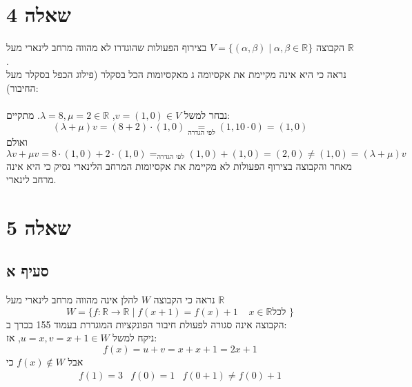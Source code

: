 \documentclass{article}
\newcommand\underrel[2]{\mathrel{\mathop{#2}\limits_{#1}}}
\DeclareMathOperator*{\equals}{=}
\begin{document}
\pagebreak

\section*{שאלה 4}

הקבוצה $V=\{(\alpha, \beta)\;|\; \alpha, \beta \in \mathbb{R}\}$
בצירוף הפעולות שהוגדרו לא מהווה מרחב לינארי מעל $\mathbb{R}$.\\
נראה כי היא אינה מקיימת את אקסיומה ג מאקסיומות הכל בסקלר (פילוג הכפל בסקלר מעל החיבור):
\\\\
נבחר למשל $v=(1,0)\in V$, $\lambda=8, \mu = 2 \in \mathbb{R}$.
מתקיים:
\[
    (\lambda + \mu)v =
    (8+2)\cdot (1,0) \underrel{\text{לפי הגדרה}}{=}
    (1,10\cdot 0) =(1,0)
\]
ואולם
\[
    \lambda v +\mu v =
    8\cdot (1,0) + 2\cdot (1,0) \equals_{\text{לפי הגדרה}}
    (1,0) + (1,0) = (2,0) \ne (1,0) = (\lambda + \mu)v
\]
מאחר והקבוצה בצירוף הפעולות לא מקיימת את אקסיומות המרחב הלינארי נסיק כי היא אינה מרחב לינארי.

\section*{שאלה 5}

\subsection*{סעיף א}

נראה כי הקבוצה $W$ להלן אינה מהווה מרחב לינארי מעל $\mathbb{R}$
\[
    W=\{f: \mathbb{R} \rightarrow \mathbb{R} \; | \; f(x+1) = f(x)+1 \;\;\;\; x\in \mathbb{R} \text{לכל } \}
\]
הקבוצה אינה סגורה לפעולת חיבור הפונקציות המוגדרת בעמוד 155 בכרך ב: \\
ניקח למשל $u=x, v=x+1\in W$, אז:
\[
    f(x)=u+v=
    x+x+1=
    2x+1
\]
אבל $f(x)\notin W$
כי
\[
    \begin{matrix}
        f(1)=3 & f(0) = 1 & f(0+1)\ne f(0)+1
    \end{matrix}
\]
\end{document}
